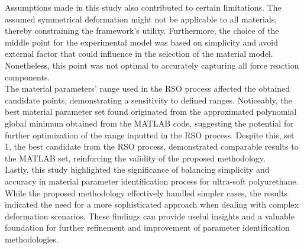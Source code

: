 Assumptions made in this study also contributed to certain limitations. The assumed symmetrical
deformation might not be applicable to all materials, thereby constraining the framework's
utility. Furthermore, the choice of the middle point for the experimental model was based on
simplicity and avoid external factor that could influence in the selection of the material 
model. Nonetheless, this point was not optimal to accurately capturing all force reaction 
components.\\

The material parameters' range used in the RSO process affected the obtained candidate points, 
demonstrating a sensitivity to defined ranges. Noticeably, the best material parameter set 
found originated from the approximated polynomial global minimum obtained from the MATLAB code, 
suggesting the potential for further optimization of the range inputted in the RSO process. 
Despite this, set \SI{1}{}, the best candidate from the RSO process, demonstrated comparable 
results to the MATLAB set, reinforcing the validity of the proposed methodology.\\

Lastly, this study highlighted the significance
of balancing simplicity and accuracy in material parameter identification process for ultra-soft polyurethane. 
While the proposed methodology effectively handled simpler cases, the results indicated
the need for a more sophisticated approach when dealing with complex deformation scenarios.
These findings can provide useful insights and a valuable foundation for further refinement and 
improvement of parameter identification methodologies.








